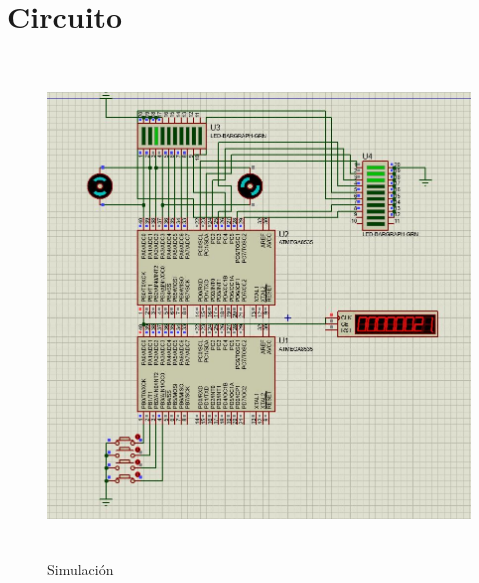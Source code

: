 \documentclass{article}
\begin{document}
\section{Circuito}
\begin{figure}[htpb!]
	\centering
	\caption{Simulación}
	\includegraphics[height=500px, width=500px]{img/sym}
\end{figure}
\end{document}
